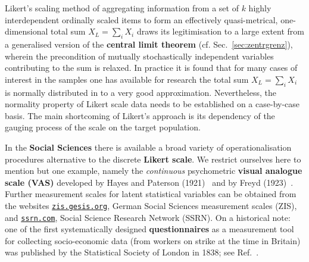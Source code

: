\medskip
\noindent
Likert's scaling method of aggregating information from a set of  
$k$ highly interdependent ordinally scaled items to form an 
effectively quasi-metrical, one-dimensional total sum 
${\displaystyle X_{L}=\sum_{i}X_{i}}$ draws its legitimisation to 
a large extent from a generalised version of the \textbf{central 
limit theorem} (cf. Sec.~\ref{sec:zentrgrenz}), wherein the 
precondition of mutually stochastically independent variables 
contributing to the sum is relaxed. In practice it is found that 
for many cases of interest in the samples one has available for 
research the total sum  ${\displaystyle X_{L}=\sum_{i}X_{i}}$ is 
normally distributed in to a very good approximation. 
Nevertheless, the normality property of Likert scale data needs to 
be established on a case-by-case basis. The main shortcoming of 
Likert's approach is its dependency of the gauging process of the 
scale on the target population.

\medskip
\noindent
In the \textbf{Social Sciences} there is available a broad variety
of operationalisation procedures alternative to the discrete
\textbf{Likert scale}. We restrict ourselves here to mention but
one example, namely the \textit{continuous} psychometric
\textbf{visual analogue scale (VAS)} developed by Hayes and
Paterson (1921)~ and by Freyd (1923)~.
Further measurement scales for latent statistical variables can be 
obtained from the websites 
\href{http://zis.gesis.org/ZisApplication/}{\texttt{zis.gesis.org}},
German Social Sciences measurement scales (ZIS), 
and \href{http://www.ssrn.com}{\texttt{ssrn.com}}, Social Science 
Research Network (SSRN). On a historical note: one of the first 
systematically designed \textbf{questionnaires} as a measurement
tool for collecting socio-economic data (from workers on strike at
the time in Britain) was published by the Statistical Society of 
London in 1838; see Ref.~.

